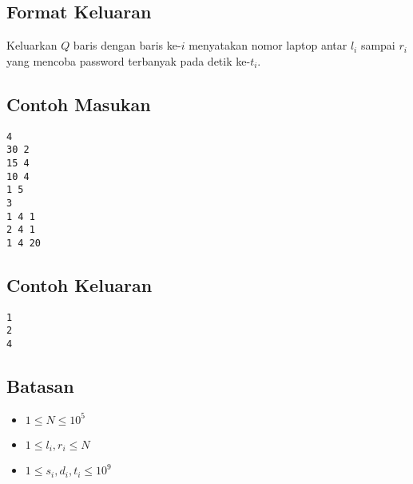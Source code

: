 \documentclass{article}
\begin{document}
\subsection*{Format Keluaran}

\par\noindent Keluarkan $Q$ baris dengan baris ke-$i$ menyatakan nomor laptop antar $l_i$ sampai $r_i$ yang mencoba password terbanyak pada detik ke-$t_i$.

\subsection*{Contoh Masukan}

\begin{lstlisting}
4
30 2
15 4
10 4
1 5
3
1 4 1
2 4 1
1 4 20
\end{lstlisting}

\subsection*{Contoh Keluaran}

\begin{lstlisting}
1
2
4
\end{lstlisting}

\subsection*{Batasan}

\begin{itemize}
  \item $1 \leq N \leq 10^5$
  \item $1 \leq l_i, r_i \leq N$
  \item $1 \leq s_i, d_i, t_i \leq 10^9$
\end{itemize}
\end{document}
